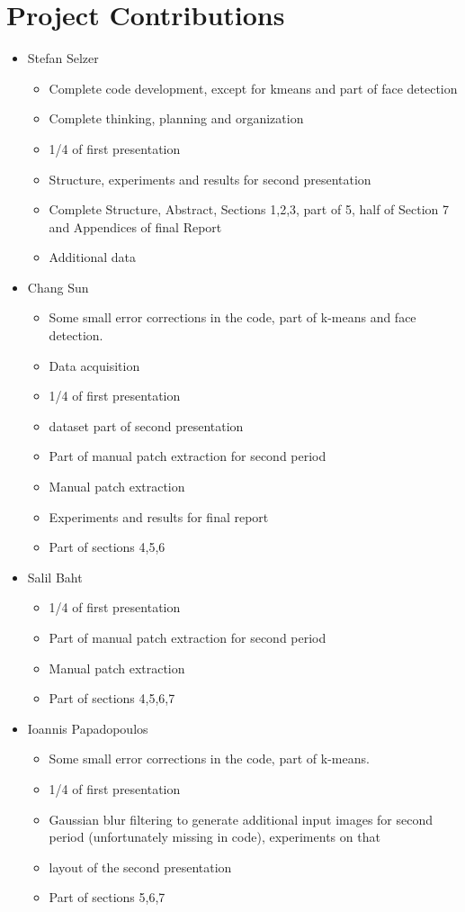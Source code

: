 \section{Project Contributions}

\begin{itemize}
	\item Stefan Selzer
	\begin{itemize}
	\item Complete code development, except for kmeans and part of face detection
	\item Complete thinking, planning and organization
	\item 1/4 of first presentation
	\item Structure, experiments and results for second presentation
	\item Complete Structure, Abstract, Sections 1,2,3, part of 5, half of Section 7 and Appendices of final Report
	\item Additional data
	\end{itemize}
	\item Chang Sun
	\begin{itemize}
	\item Some small error corrections in the code, part of k-means and face detection.
	\item Data acquisition
	\item 1/4 of first presentation
	\item dataset part of second presentation
	\item Part of manual patch extraction for second period
	\item Manual patch extraction
	\item Experiments and results for final report
	\item Part of sections 4,5,6
	\end{itemize}
	\item Salil Baht
	\begin{itemize}
	\item 1/4 of first presentation
	\item Part of manual patch extraction for second period
	\item Manual patch extraction
	\item Part of sections 4,5,6,7
	\end{itemize}
	\item Ioannis Papadopoulos
	\begin{itemize}
	\item Some small error corrections in the code, part of k-means.
	\item 1/4 of first presentation
	\item Gaussian blur filtering to generate additional input images for second period (unfortunately missing in code), experiments on that
	\item layout of the second presentation
	\item Part of sections 5,6,7
	\end{itemize}
\end{itemize}
